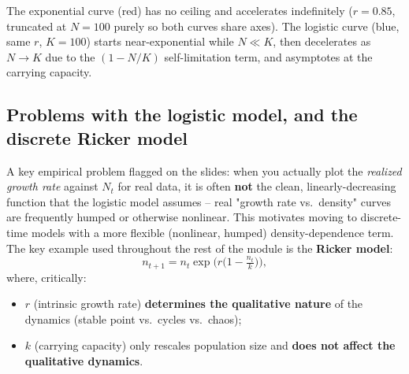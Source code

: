 \documentclass[11pt,a4paper]{article}
\begin{document}
\begin{figbox}[title={Exponential vs.\ logistic population growth}]
\centering
{}

\vspace{1mm}
\footnotesize The exponential curve (red) has no ceiling and accelerates indefinitely ($r=0.85$, truncated at $N=100$ purely so both curves share axes). The logistic curve (blue, same $r$, $K=100$) starts near-exponential while $N\ll K$, then decelerates as $N\to K$ due to the $(1-N/K)$ self-limitation term, and asymptotes at the carrying capacity.
\end{figbox}

\subsection{Problems with the logistic model, and the discrete Ricker model}
A key empirical problem flagged on the slides: when you actually plot the \emph{realized growth rate} against $N_t$ for real data, it is often \textbf{not} the clean, linearly-decreasing function that the logistic model assumes -- real "growth rate vs.\ density" curves are frequently humped or otherwise nonlinear. This motivates moving to discrete-time models with a more flexible (nonlinear, humped) density-dependence term. The key example used throughout the rest of the module is the \textbf{Ricker model}:
\[
n_{t+1} = n_t \exp\!\Big(r\big(1 - \tfrac{n_t}{k}\big)\Big),
\]
where, critically:
\begin{itemize}[leftmargin=1.5em]
\item $r$ (intrinsic growth rate) \textbf{determines the qualitative nature} of the dynamics (stable point vs.\ cycles vs.\ chaos);
\item $k$ (carrying capacity) only rescales population size and \textbf{does not affect the qualitative dynamics}.
\end{itemize}
\end{document}
